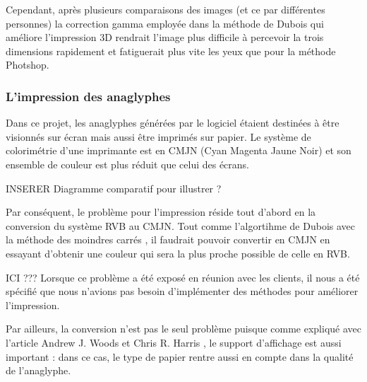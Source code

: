 Cependant, après plusieurs comparaisons des images (et ce par différentes personnes) la correction gamma employée dans la méthode de Dubois qui améliore l'impression 3D rendrait l'image plus difficile à percevoir la trois dimensions rapidement et fatiguerait plus vite les yeux que pour la méthode Photshop.


\subsubsection{L'impression des anaglyphes}
Dans ce projet, les anaglyphes générées par le logiciel étaient destinées à être visionnés sur écran mais aussi être imprimés sur papier. Le système de colorimétrie d'une imprimante est en CMJN (Cyan Magenta Jaune Noir) et son ensemble de couleur est plus réduit que celui des écrans. 

INSERER Diagramme comparatif pour illustrer ?

Par conséquent, le problème pour l'impression réside tout d'abord en la conversion du système RVB au CMJN. Tout comme l'algortihme de Dubois avec la méthode des moindres carrés \cite{algoDubois}, il faudrait pouvoir convertir en CMJN en essayant d'obtenir une couleur qui sera la plus proche possible de celle en RVB. 

ICI ??? Lorsque ce problème a été exposé en réunion avec les clients, il nous a été spécifié que nous n'avions pas besoin d'implémenter des méthodes pour améliorer l'impression. 

Par ailleurs, la conversion n'est pas le seul problème puisque comme expliqué avec l'article Andrew J. Woods et Chris R. Harris \cite{anaglypheDefaut}, le support d'affichage est aussi important : dans ce cas, le type de papier rentre aussi en compte dans la qualité de l'anaglyphe. 
